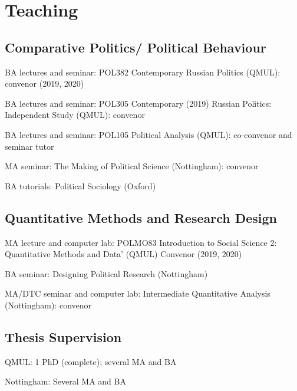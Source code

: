 \documentclass[12pt,letterpaper]{report}
\newcommand{\listitemspace}{0.25em}
\renewenvironment{itemize}
{\begin{list}{}{\setlength{\leftmargin}{0em}
                \setlength{\parskip}{0em}
                \setlength{\itemsep}{\listitemspace}
                \setlength{\parsep}{\listitemspace}}}
{\end{list}}
\begin{document}
   \section*{Teaching}

\subsection*{Comparative Politics/ Political Behaviour}

  \begin{itemize}
	
	\item BA lectures and seminar: POL382 Contemporary Russian Politics (QMUL): convenor (2019, 2020) 
	\item BA lectures and seminar: POL305 Contemporary (2019) Russian Politics: Independent Study (QMUL): convenor
	\item BA lectures and seminar: POL105 Political Analysis (QMUL): co-convenor and seminar tutor 
	\item MA seminar: The Making of Political Science (Nottingham): convenor
	\item BA tutorials: Political Sociology (Oxford)
	
\end{itemize}
%
\subsection*{Quantitative Methods and Research Design}


	
  \begin{itemize}
	
	\item MA lecture and computer lab: POLMO83 Introduction to Social Science 2: Quantitative Methods and Data’  (QMUL) Convenor (2019, 2020) 
	\item BA seminar: Designing Political Research (Nottingham)
	\item MA/DTC seminar and computer lab: Intermediate Quantitative Analysis (Nottingham): convenor
	
\end{itemize}
	
\subsection*{Thesis Supervision}

\begin{itemize}
	\item QMUL: 1 PhD (complete); several MA and BA
	\item Nottingham: Several MA and BA
\end{itemize}
\end{document}
